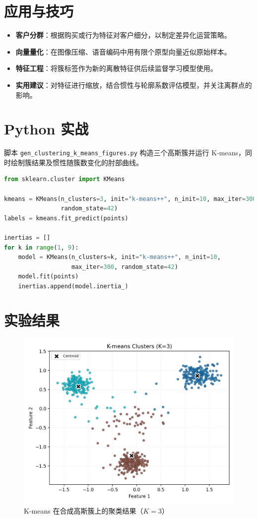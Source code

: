 \documentclass[UTF8,zihao=-4]{ctexart}
\begin{document}
\section{应用与技巧}
\begin{itemize}
  \item \textbf{客户分群}：根据购买或行为特征对客户细分，以制定差异化运营策略。
  \item \textbf{向量量化}：在图像压缩、语音编码中用有限个原型向量近似原始样本。
  \item \textbf{特征工程}：将簇标签作为新的离散特征供后续监督学习模型使用。
  \item \textbf{实用建议}：对特征进行缩放，结合惯性与轮廓系数评估模型，并关注离群点的影响。
\end{itemize}

\section{Python 实战}
脚本 \texttt{gen\_clustering\_k\_means\_figures.py} 构造三个高斯簇并运行 K-means，同时绘制簇结果及惯性随簇数变化的肘部曲线。
\begin{lstlisting}[language=Python,caption={脚本 gen_clustering_k_means_figures.py 片段}]
from sklearn.cluster import KMeans

kmeans = KMeans(n_clusters=3, init="k-means++", n_init=10, max_iter=300,
                random_state=42)
labels = kmeans.fit_predict(points)

inertias = []
for k in range(1, 9):
    model = KMeans(n_clusters=k, init="k-means++", n_init=10,
                   max_iter=300, random_state=42)
    model.fit(points)
    inertias.append(model.inertia_)
\end{lstlisting}

\section{实验结果}
\begin{figure}[H]
  \centering
  \includegraphics[width=0.82\linewidth]{kmeans_clusters.png}
  \caption{K-means 在合成高斯簇上的聚类结果（\(K=3\)）}
  \label{fig:kmeans_clusters_cn}
\end{figure}
\end{document}
